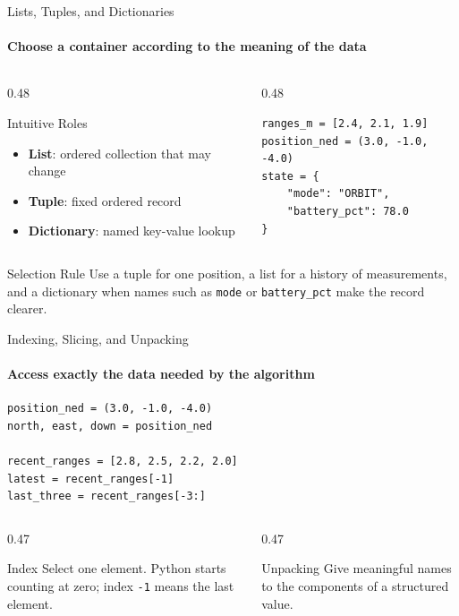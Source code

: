\begin{frame}[fragile]{Lists, Tuples, and Dictionaries}
\framesubtitle{Choose a container according to the meaning of the data}
\small
\begin{columns}[T,onlytextwidth]
\begin{column}{0.48\textwidth}
\begin{block}{Intuitive Roles}
\begin{itemize}
\item \textbf{List}: ordered collection that may change
\item \textbf{Tuple}: fixed ordered record
\item \textbf{Dictionary}: named key-value lookup
\end{itemize}
\end{block}
\end{column}
\hfill
\begin{column}{0.48\textwidth}
\begin{verbatim}
ranges_m = [2.4, 2.1, 1.9]
position_ned = (3.0, -1.0, -4.0)
state = {
    "mode": "ORBIT",
    "battery_pct": 78.0
}
\end{verbatim}
\end{column}
\end{columns}
\begin{exampleblock}{Selection Rule}
Use a tuple for one position, a list for a history of measurements, and a dictionary when names such as \texttt{mode} or \texttt{battery\_pct} make the record clearer.
\end{exampleblock}
\end{frame}

\begin{frame}[fragile]{Indexing, Slicing, and Unpacking}
\framesubtitle{Access exactly the data needed by the algorithm}
\begin{verbatim}
position_ned = (3.0, -1.0, -4.0)
north, east, down = position_ned

recent_ranges = [2.8, 2.5, 2.2, 2.0]
latest = recent_ranges[-1]
last_three = recent_ranges[-3:]
\end{verbatim}
\begin{columns}[T,onlytextwidth]
\begin{column}{0.47\textwidth}
\begin{block}{Index}
Select one element. Python starts counting at zero; index \texttt{-1} means the last element.
\end{block}
\end{column}
\hfill
\begin{column}{0.47\textwidth}
\begin{block}{Unpacking}
Give meaningful names to the components of a structured value.
\end{block}
\end{column}
\end{columns}
\end{frame}

